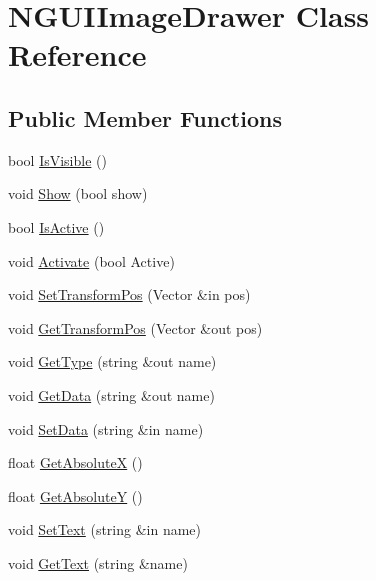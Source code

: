 \hypertarget{class_n_g_u_i_image_drawer}{}\section{N\+G\+U\+I\+Image\+Drawer Class Reference}
\label{class_n_g_u_i_image_drawer}
\subsection*{Public Member Functions}
\begin{DoxyCompactItemize}
\item 
bool \hyperlink{class_n_g_u_i_image_drawer_af90ab84e6704e1f0ca7fcc4817232cc4}{Is\+Visible} ()
\item 
void \hyperlink{class_n_g_u_i_image_drawer_a5721081398080170fb1258cd76d59b93}{Show} (bool show)
\item 
bool \hyperlink{class_n_g_u_i_image_drawer_a51bd7012d812b9ebd598efa88b53d0c3}{Is\+Active} ()
\item 
void \hyperlink{class_n_g_u_i_image_drawer_afa6cb812851c3d2aa7516c0ce47de933}{Activate} (bool Active)
\item 
void \hyperlink{class_n_g_u_i_image_drawer_a47a6c352ca3c5343f08506097b413fb3}{Set\+Transform\+Pos} (Vector \&in pos)
\item 
void \hyperlink{class_n_g_u_i_image_drawer_a0afde960d00a89b2b7c2c622771deb29}{Get\+Transform\+Pos} (Vector \&out pos)
\item 
void \hyperlink{class_n_g_u_i_image_drawer_a57b78d51ac65ee923dcddadd87379baa}{Get\+Type} (string \&out name)
\item 
void \hyperlink{class_n_g_u_i_image_drawer_abe5372ff63cef584ae8653f948f2e37f}{Get\+Data} (string \&out name)
\item 
void \hyperlink{class_n_g_u_i_image_drawer_a6e3f8f6d844484edb699ac9f4b4ab26d}{Set\+Data} (string \&in name)
\item 
float \hyperlink{class_n_g_u_i_image_drawer_accd59637d5057b838fe127aad590daf6}{Get\+AbsoluteX} ()
\item 
float \hyperlink{class_n_g_u_i_image_drawer_a008fbfcc826ebf1733ac5eef332c9afb}{Get\+AbsoluteY} ()
\item 
void \hyperlink{class_n_g_u_i_image_drawer_a19319f2af462deabc1a40cbcb0e2ddbe}{Set\+Text} (string \&in name)
\item 
void \hyperlink{class_n_g_u_i_image_drawer_ab536c59b63703dc1d6184bbd43a2e4a4}{Get\+Text} (string \&name)
\item 

\end{DoxyCompactItemize}
